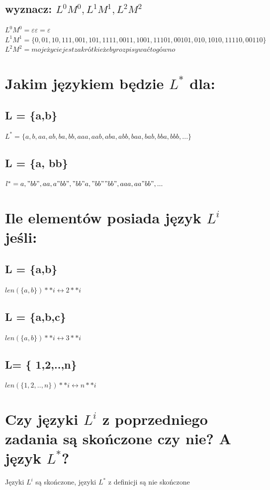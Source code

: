 \documentclass[a4paper,11pt]{article}
\begin{document}
\subsection{wyznacz: $L^0 M^0, L^1 M^1, L^2 M^2$}
$L^0M^0 = \varepsilon \varepsilon = \varepsilon$ \\
$L^1 M^1 = \{0, 01, 10, 111, 001, 101, 1111, 0011, 1001, 11101, 00101, 010, 1010, 11110, 00110\}$ \\
$L^2 M^2 = moje życie jest za krótkie żeby rozpisywać to gówno$

\section{Jakim językiem będzie $L^*$ dla:}
\subsection{L = \{a,b\}}
$L^* = \{a,b,aa,ab,ba,bb, aaa,aab,aba,abb,baa,bab,bba,bbb,...\}$
\subsection{L = \{a, bb\}}
$l^* = {a, "bb", aa, a"bb", "bb"a, "bb""bb", aaa, aa"bb", ...}$

\newpage
\section{Ile elementów posiada język $L^i$ jeśli:}
\subsection{L = \{a,b\}}
$len(\{a,b\}) ** i \leftrightarrow 2 ** i$
\subsection{L = \{a,b,c\}}
$len(\{a,b\}) ** i \leftrightarrow 3 ** i$
\subsection{L= \{ 1,2,..,n\}}
$len(\{1,2,..,n\}) ** i \leftrightarrow n ** i$

\section{Czy języki $L^i$ z poprzedniego zadania są skończone czy nie? A język $L^*$?}

Języki $L^i$ są skończone, języki $L^*$ z definicji są nie skończone
\end{document}
